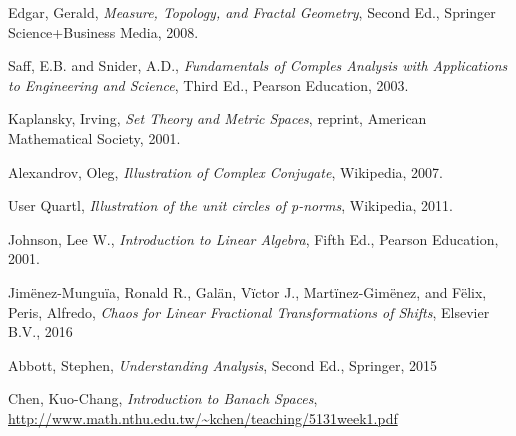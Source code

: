 \documentclass[11pt]{article}
\theoremstyle{plain}
\theoremstyle{definition}
\begin{document}
\newpage  
\begin{thebibliography}{99}
\singlespacing

 Edgar, Gerald, \emph{Measure, Topology, and Fractal Geometry}, Second Ed., Springer Science+Business Media, 2008.

 Saff, E.B. and Snider, A.D., \emph{Fundamentals of Comples Analysis with Applications to Engineering and Science}, Third Ed., Pearson Education, 2003.

 Kaplansky, Irving, \emph{Set Theory and Metric Spaces}, reprint, American Mathematical Society, 2001.

 Alexandrov, Oleg, \emph{Illustration of Complex Conjugate}, Wikipedia, 2007.

 User Quartl, \emph{Illustration of the unit circles of p-norms}, Wikipedia, 2011.

 Johnson, Lee W., \emph{Introduction to Linear Algebra}, Fifth Ed., Pearson Education, 2001.

 Jim{\"e}nez-Mungu{\"i}a, Ronald R., Gal{\"a}n, V{\"i}ctor J., Mart{\"i}nez-Gim{\"e}nez, and F{\"e}lix, Peris, Alfredo, \emph{Chaos for Linear Fractional Transformations of Shifts}, Elsevier B.V., 2016

 Abbott, Stephen, \emph{Understanding Analysis}, Second Ed., Springer, 2015

 Chen, Kuo-Chang, \emph{Introduction to Banach Spaces}, \url{http://www.math.nthu.edu.tw/~kchen/teaching/5131week1.pdf}

\end{thebibliography}

\end{document}
